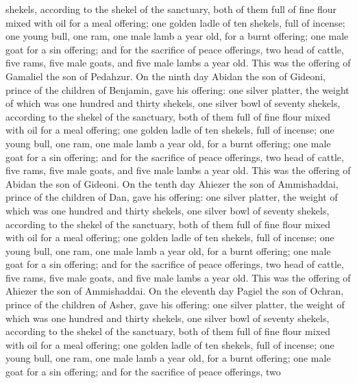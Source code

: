 shekels, according to the shekel of the sanctuary, both of them full of
fine flour mixed with oil for a meal offering;  one
golden ladle of ten shekels, full of incense;  one young
bull, one ram, one male lamb a year old, for a burnt offering;
 one male goat for a sin offering;  and
for the sacrifice of peace offerings, two head of cattle, five rams,
five male goats, and five male lambs a year old. This was the offering
of Gamaliel the son of Pedahzur.  On the ninth day Abidan
the son of Gideoni, prince of the children of Benjamin, 
gave his offering: one silver platter, the weight of which was one
hundred and thirty shekels, one silver bowl of seventy shekels,
according to the shekel of the sanctuary, both of them full of fine
flour mixed with oil for a meal offering;  one golden
ladle of ten shekels, full of incense;  one young bull,
one ram, one male lamb a year old, for a burnt offering; 
one male goat for a sin offering;  and for the sacrifice
of peace offerings, two head of cattle, five rams, five male goats, and
five male lambs a year old. This was the offering of Abidan the son of
Gideoni.  On the tenth day Ahiezer the son of
Ammishaddai, prince of the children of Dan,  gave his
offering: one silver platter, the weight of which was one hundred and
thirty shekels, one silver bowl of seventy shekels, according to the
shekel of the sanctuary, both of them full of fine flour mixed with oil
for a meal offering;  one golden ladle of ten shekels,
full of incense;  one young bull, one ram, one male lamb
a year old, for a burnt offering;  one male goat for a
sin offering;  and for the sacrifice of peace offerings,
two head of cattle, five rams, five male goats, and five male lambs a
year old. This was the offering of Ahiezer the son of Ammishaddai.
 On the eleventh day Pagiel the son of Ochran, prince of
the children of Asher,  gave his offering: one silver
platter, the weight of which was one hundred and thirty shekels, one
silver bowl of seventy shekels, according to the shekel of the
sanctuary, both of them full of fine flour mixed with oil for a meal
offering;  one golden ladle of ten shekels, full of
incense;  one young bull, one ram, one male lamb a year
old, for a burnt offering;  one male goat for a sin
offering;  and for the sacrifice of peace offerings, two
